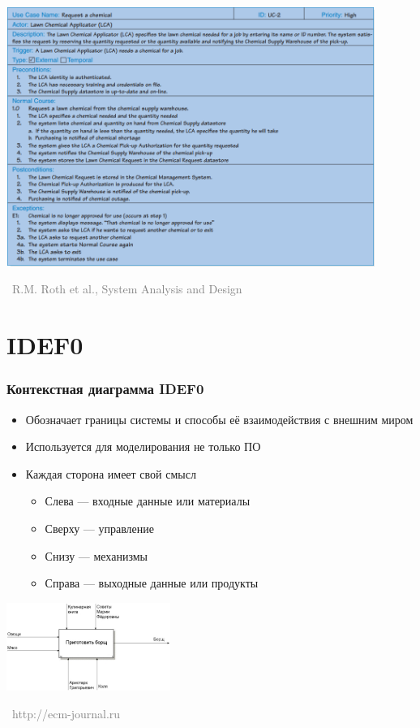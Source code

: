 \documentclass[xetex,mathserif,serif]{beamer}
\newcommand{\attribution}[1] {
	\vspace{-5mm}\begin{flushright}\begin{scriptsize}\textcolor{gray}{\textcopyright\, #1}\end{scriptsize}\end{flushright}
}
\begin{document}
	\begin{frame}
		\begin{center}
			\includegraphics[width=0.9\textwidth]{useCaseExample.png}
			\attribution{R.M. Roth et al., System Analysis and Design}
		\end{center}
	\end{frame}

	\section{IDEF0}

	\begin{frame}
		\frametitle{Контекстная диаграмма IDEF0}
		\begin{itemize}
			\item Обозначает границы системы и способы её взаимодействия с внешним миром
			\item Используется для моделирования не только ПО
			\item Каждая сторона имеет свой смысл
			\begin{itemize}
				\item Слева --- входные данные или материалы
				\item Сверху --- управление
				\item Снизу --- механизмы
				\item Справа --- выходные данные или продукты
			\end{itemize}
		\end{itemize}
		\begin{center}
			\includegraphics[width=0.4\textwidth]{idef0Example.png}
			\attribution{http://ecm-journal.ru}
		\end{center}
	\end{frame}
\end{document}
